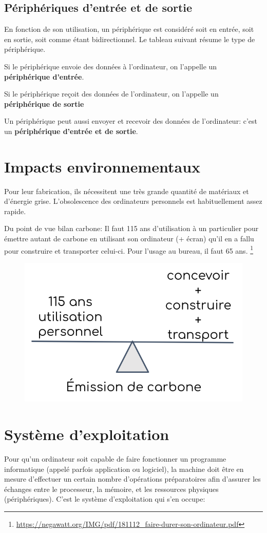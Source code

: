 \documentclass[11pt, a4paper]{book}
\begin{document}
\subsection{Périphériques d'entrée et de sortie}

En fonction de son utilisation, un périphérique est considéré soit en entrée, soit en sortie, soit comme étant bidirectionnel. Le tableau suivant résume le type de périphérique.

Si le périphérique envoie des données à l'ordinateur, on l'appelle un {\bf périphérique d'entrée}.

Si le périphérique reçoit des données de l'ordinateur, on l'appelle un {\bf périphérique de sortie}

Un périphérique peut aussi envoyer et recevoir des données de l'ordinateur: c'est un {\bf périphérique d'entrée et de sortie}.

\section{Impacts environnementaux}
Pour leur fabrication, ils nécessitent une très grande quantité de matériaux et d’énergie grise.
L'obsolescence des ordinateurs personnels est habituellement assez rapide.

Du point de vue bilan carbone: Il faut 115 ans d’utilisation à un particulier pour émettre autant de carbone en utilisant son ordinateur (+ écran) qu’il en a fallu pour construire et transporter celui-ci.
Pour l’usage au bureau, il faut 65 ans.
\footnote{\url{https://negawatt.org/IMG/pdf/181112_faire-durer-son-ordinateur.pdf}}
\begin{figure}[h!]
    \centering
    \includegraphics[width=0.3\linewidth]{images/impact_hardware.png}
\end{figure}

\section{Système d'exploitation}

Pour qu’un ordinateur soit capable de faire fonctionner un programme informatique (appelé parfois application ou logiciel), la machine doit être en mesure d’effectuer un certain nombre d’opérations préparatoires afin d’assurer les échanges entre le processeur, la mémoire, et les ressources physiques (périphériques). C'est le système d'exploitation qui s'en occupe:
\end{document}

